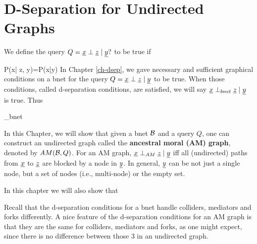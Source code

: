 \chapter{D-Separation for Undirected Graphs}
\label{ch-dsep-ug}

We define  the query $Q=\rvx\perp\rvz\mid \rvy?$
to be true if

\beq
P(x| z, y)=P(x|y)
\eeq
In Chapter \ref{ch-dsep},
we gave necessary and sufficient
graphical conditions on a bnet
for the query $Q=\rvx\perp\rvz\mid \rvy$ to be true.
When those conditions, called d-separation conditions, are
satisfied, we will say $\rvx\perp_{bnet} \rvz\mid \rvy$ is true. Thus

\beq
\rvx\perp \rvz\mid \rvy
\iff
\rvx\perp_{bnet} \rvz\mid \rvy
\eeq

In this Chapter, we will show that given
a bnet ${\cal B}$ and a query $Q$, one can construct an
undirected graph called the {\bf ancestral
moral (AM) graph},
denoted by $AM({\cal B}, Q)$.
For an AM graph, $\rvx\perp_{AM}\rvz\mid \rvy$
iff all (undirected) paths from
$\rvx$ to $\rvz$ are blocked by a node in $\rvy$. In general, $\rvy$ can be not just a single node, but a set of nodes (i.e., multi-node) or the empty set.

In this chapter we will also
show that

\beq
{}
\label{eq-perp-bnet-AM}
\eeq
Recall that the d-separation conditions for
a bnet handle
colliders, mediators and  forks differently.
A nice feature of the d-separation conditions for an AM graph is that
they are the same for colliders, mediators and  forks, as one might
expect, since there is no difference
between those 3 in an undirected graph.




